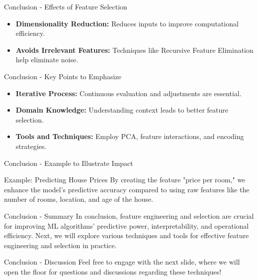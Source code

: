 \documentclass[aspectratio=169]{beamer}
\begin{document}
\begin{frame}[fragile]{Conclusion - Effects of Feature Selection}
    \begin{itemize}
        \item \textbf{Dimensionality Reduction:} Reduces inputs to improve computational efficiency.
        \item \textbf{Avoids Irrelevant Features:} Techniques like Recursive Feature Elimination help eliminate noise.
    \end{itemize}
\end{frame}

\begin{frame}[fragile]{Conclusion - Key Points to Emphasize}
    \begin{itemize}
        \item \textbf{Iterative Process:} Continuous evaluation and adjustments are essential.
        \item \textbf{Domain Knowledge:} Understanding context leads to better feature selection.
        \item \textbf{Tools and Techniques:} Employ PCA, feature interactions, and encoding strategies.
    \end{itemize}
\end{frame}

\begin{frame}[fragile]{Conclusion - Example to Illustrate Impact}
    \begin{block}{Example: Predicting House Prices}
        By creating the feature "price per room," we enhance the model's predictive accuracy compared to using raw features like the number of rooms, location, and age of the house.
    \end{block}
\end{frame}

\begin{frame}[fragile]{Conclusion - Summary}
    In conclusion, feature engineering and selection are crucial for improving ML algorithms' predictive power, interpretability, and operational efficiency. 
    \newline
    Next, we will explore various techniques and tools for effective feature engineering and selection in practice.
\end{frame}

\begin{frame}[fragile]{Conclusion - Discussion}
    Feel free to engage with the next slide, where we will open the floor for questions and discussions regarding these techniques!
\end{frame}
\end{document}
